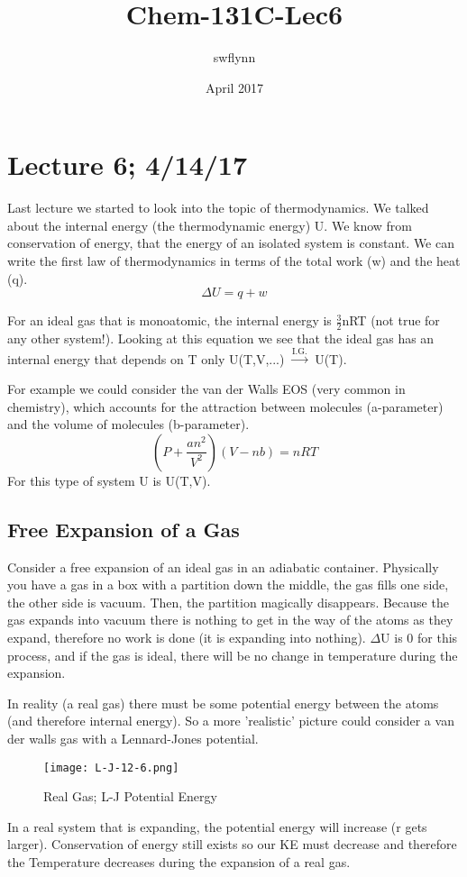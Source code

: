 \documentclass{article}
\title{Chem-131C-Lec6}
\author{swflynn }
\date{April 2017}
\begin{document}
\maketitle

\section*{Lecture 6; 4/14/17}
Last lecture we started to look into the topic of thermodynamics.
We talked about the internal energy (the thermodynamic energy) U. 
We know from conservation of energy, that the energy of an isolated system is constant.
We can write the first law of thermodynamics in terms of the total work (w) and the heat (q). 
\begin{equation}
    \Delta U = q+w
\end{equation}

For an ideal gas that is monoatomic, the internal energy is $\frac{3}{2}$nRT (not true for any other system!). 
Looking at this equation we see that the ideal gas has an internal energy that depends on T only 
U(T,V,...) $\xrightarrow{\text{I.G.}}$ U(T). 

For example we could consider the van der Walls EOS (very common in chemistry), which accounts for the attraction between molecules (a-parameter) and the volume of molecules (b-parameter).
\begin{equation}
    \left( {P + \frac{{an^2 }}{{V^2 }}} \right)\left( {V - nb} \right) = nRT
\end{equation}
For this type of system U is U(T,V).

\subsection*{Free Expansion of a Gas}
Consider a free expansion of an ideal gas in an adiabatic container. 
Physically you have a gas in a box with a partition down the middle, the gas fills one side, the other side is vacuum.
Then, the partition magically disappears.
Because the gas expands into vacuum there is nothing to get in the way of the atoms as they expand, therefore no work is done (it is expanding into nothing). 
$\Delta$U is 0 for this process, and if the gas is ideal, there will be no change in temperature during the expansion.

In reality (a real gas) there must be some potential energy between the atoms (and therefore internal energy). 
So a more 'realistic' picture could consider a van der walls gas with a Lennard-Jones potential. 
\begin{figure}[h!]
    \centering
    \texttt{[image: L-J-12-6.png]}
    \caption{Real Gas; L-J Potential Energy}
    \label{fig:LJ1}
\end{figure}
In a real system that is expanding, the potential energy will increase (r gets larger).
Conservation of energy still exists so our KE must decrease and therefore the Temperature decreases during the expansion of a real gas. 
\end{document}
